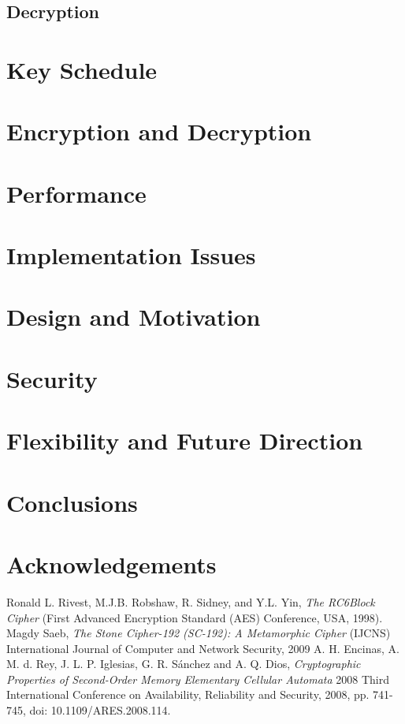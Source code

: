 \documentclass{article}
\begin{document}
\subsection{Decryption}

\section{Key Schedule}

\section{Encryption and Decryption}

\section{Performance}

\section{Implementation Issues}

\section{Design and Motivation}

\section{Security}

\section{Flexibility and Future Direction}

\section{Conclusions}

\section{Acknowledgements}

\begin{thebibliography}{unsrt}
  Ronald L. Rivest, M.J.B. Robshaw, R. Sidney, and Y.L. Yin, \emph{The RC6\texttrademark Block Cipher} (First Advanced Encryption Standard (AES) Conference, USA, 1998).
  Magdy Saeb, \emph{The Stone Cipher-192 (SC-192): A Metamorphic Cipher} (IJCNS) International Journal of Computer and Network Security, 2009
  A. H. Encinas, A. M. d. Rey, J. L. P. Iglesias, G. R. Sánchez and A. Q. Dios, \emph{Cryptographic Properties of Second-Order Memory Elementary Cellular Automata} 2008 Third International Conference on Availability, Reliability and Security, 2008, pp. 741-745, doi: 10.1109/ARES.2008.114.
\end{thebibliography}
\end{document}
